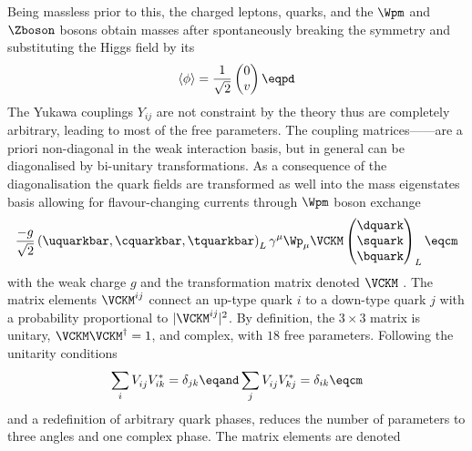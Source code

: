 Being massless prior to this, the charged leptons, quarks, and the $\Wpm$ and
$\Zboson$ bosons obtain masses after spontaneously breaking the symmetry and
substituting the Higgs field by its \VEV
%
\begin{equation}\label{sec:cpv_theory:flavour_physics:ckm_matrix:higgs_vev}
  \langle\phi\rangle = \frac{1}{\sqrt{2}} \begin{pmatrix}
    0 \\
    v \\
  \end{pmatrix}\eqpd
\end{equation}
%
The Yukawa couplings $Y_{ij}$ are not constraint by the theory thus are
completely arbitrary, leading to most of the free \SM parameters. The coupling
matrices------are a priori non-diagonal in the weak
interaction basis, but in general can be diagonalised by bi-unitary
transformations. As a consequence of the diagonalisation the quark fields are
transformed as well into the mass eigenstates basis allowing for
flavour-changing currents through $\Wpm$ boson exchange 
%
\begin{equation}
  \frac{-g}{\sqrt{2}} \left( \uquarkbar, \cquarkbar, \tquarkbar \right)_L \gamma^\mu \Wp_\mu \VCKM 
  \begin{pmatrix}
    \dquark \\
    \squark \\
    \bquark \\
  \end{pmatrix}_L \eqcm
\end{equation}
%
with the weak charge $g$ and the transformation matrix denoted $\VCKM$
\cite{Cabibbo:1963yz,Kobayashi:1973fv}. The \CKM matrix elements $\VCKM^{ij}$
connect an up-type quark $i$ to a down-type quark $j$ with a probability
proportional to $\vert\VCKM^{ij}\vert^2$. By definition, the $3 \times 3$ \CKM
matrix is unitary, $\VCKM\VCKM^\dagger=1$, and complex, with $\num{18}$ free
parameters. Following the unitarity conditions
%
\begin{equation}\label{sec:cpv_theory:flavour_physics:ckm_matrix:unitarity_relations}
  \sum_i V_{ij}^{\phantom{\ast}} V_{ik}^{\ast} = \delta_{jk} \eqand
  \sum_j V_{ij}^{\phantom{\ast}} V_{kj}^{\ast} = \delta_{ik} \eqcm
\end{equation}
%
and a redefinition of arbitrary quark phases, reduces the number of parameters
to three angles and one complex phase. The matrix elements are denoted
%
